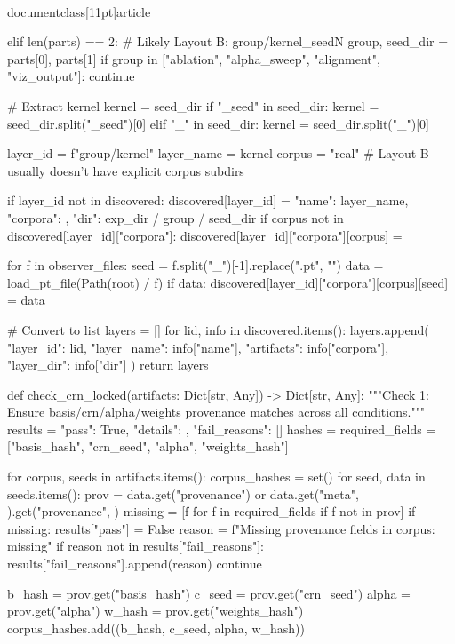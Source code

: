 \\documentclass[11pt]{article}
\begin{document}
\begin{CodeBlock}
        elif len(parts) == 2:
            # Likely Layout B: group/kernel_seedN
            group, seed_dir = parts[0], parts[1]
            if group in ["ablation", "alpha_sweep", "alignment", "viz_output"]: continue
            
            # Extract kernel
            kernel = seed_dir
            if "_seed" in seed_dir: kernel = seed_dir.split("_seed")[0]
            elif "_" in seed_dir: kernel = seed_dir.split("_")[0]
            
            layer_id = f"{group}/{kernel}"
            layer_name = kernel
            corpus = "real" # Layout B usually doesn't have explicit corpus subdirs
            
            if layer_id not in discovered: discovered[layer_id] = {"name": layer_name, "corpora": {}, "dir": exp_dir / group / seed_dir}
            if corpus not in discovered[layer_id]["corpora"]: discovered[layer_id]["corpora"][corpus] = {}
            
            for f in observer_files:
                seed = f.split("_")[-1].replace(".pt", "")
                data = load_pt_file(Path(root) / f)
                if data: discovered[layer_id]["corpora"][corpus][seed] = data

    # Convert to list
    layers = []
    for lid, info in discovered.items():
        layers.append({
            "layer_id": lid,
            "layer_name": info["name"],
            "artifacts": info["corpora"],
            "layer_dir": info["dir"]
        })
    return layers

def check_crn_locked(artifacts: Dict[str, Any]) -> Dict[str, Any]:
    """Check 1: Ensure basis/crn/alpha/weights provenance matches across all conditions."""
    results = {"pass": True, "details": {}, "fail_reasons": []}
    hashes = {}
    required_fields = ["basis_hash", "crn_seed", "alpha", "weights_hash"]
    
    for corpus, seeds in artifacts.items():
        corpus_hashes = set()
        for seed, data in seeds.items():
            prov = data.get("provenance") or data.get("meta", {}).get("provenance", {})
            missing = [f for f in required_fields if f not in prov]
            if missing:
                results["pass"] = False
                reason = f"Missing provenance fields in {corpus}: {missing}"
                if reason not in results["fail_reasons"]: results["fail_reasons"].append(reason)
                continue

            b_hash = prov.get("basis_hash")
            c_seed = prov.get("crn_seed")
            alpha = prov.get("alpha")
            w_hash = prov.get("weights_hash")
            corpus_hashes.add((b_hash, c_seed, alpha, w_hash))
            

\end{CodeBlock}
\end{document}
